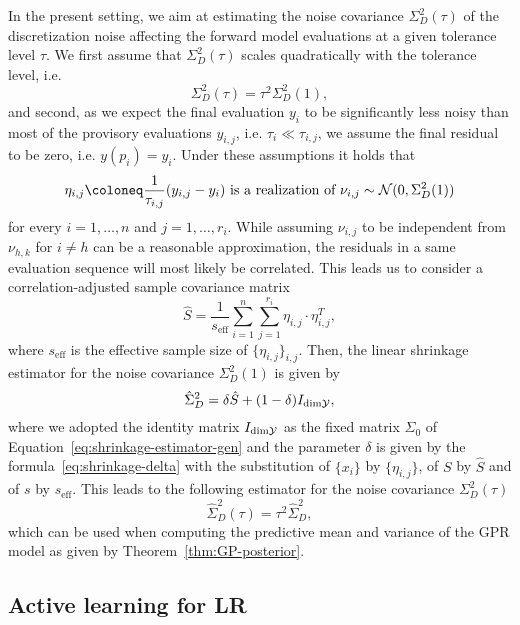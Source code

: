 In the present setting, we aim at estimating the noise covariance $\Sigma^2_D(\tau)$ of the discretization noise affecting the forward model evaluations at a given tolerance level $\tau$.
We first assume that $\Sigma^2_D(\tau)$ scales quadratically with the tolerance level, i.e. 
\[
\Sigma^2_D(\tau) = \tau^2 \Sigma^2_D(1),
\]
and second, as we expect the final evaluation $y_i$ to be significantly less noisy than most of the provisory evaluations $y_{i,j}$, i.e. $\tau_i \ll \tau_{i,j}$, we assume the final residual to be zero, i.e. $y(p_i) = y_i$.
Under these assumptions it holds that 
\[
\eta_{i,j} \coloneq \frac{1}{\tau_{i,j}} ( y_{i,j} - y_i) \text{ is a realization of } \nu_{i,j} \sim \mc N (0, \Sigma^2_D(1))
\]
for every $ i=1,\dots,n $ and $ j=1,\dots,r_i$. \newline
While assuming $\nu_{i,j}$ to be independent from $\nu_{h,k}$ for $i\neq h$ can be a reasonable approximation, the residuals in a same evaluation sequence will most likely be correlated.
This leads us to consider a correlation-adjusted sample covariance matrix  
\begin{equation}
    \hat S = \frac{1}{s_\text{eff}} \sum_{i=1}^n\sum_{j=1}^{r_i} \eta_{i,j} \cdot \eta_{i,j}^T,
\end{equation} 
where $s_{\text{eff}}$ is the effective sample size of $\{\eta_{i,j}\}_{i,j}$. \newline
Then, the linear shrinkage estimator for the noise covariance $\Sigma^2_D(1)$ is given by
\[
    \hat \Sigma_D^2 = \delta \hat S + (1-\delta) I_{\text{dim}\mathcal Y},
\]
where we adopted the identity matrix $I_{\text{dim}\mathcal Y}$ as the fixed matrix $\Sigma_0$ of Equation~\eqref{eq:shrinkage-estimator-gen} and the parameter $\delta$ is given by the formula~\eqref{eq:shrinkage-delta} with the substitution of $\{x_i\}$ by $\{\eta_{i,j}\}$, of $S$ by $\hat S$ and of $s$ by $s_{\text{eff}}$.\newline
This leads to the following estimator for the noise covariance $\Sigma^2_D(\tau)$
\begin{equation}\label{eq:shrinkage-estimator}
    \hat{\Sigma}_D^2(\tau) = \tau^2 \hat \Sigma_D^2,
\end{equation}
which can be used when computing the predictive mean and variance of the GPR model as given by Theorem~\ref{thm:GP-posterior}.

\subsection{Active learning for LR}\label{sec:LRAL}

